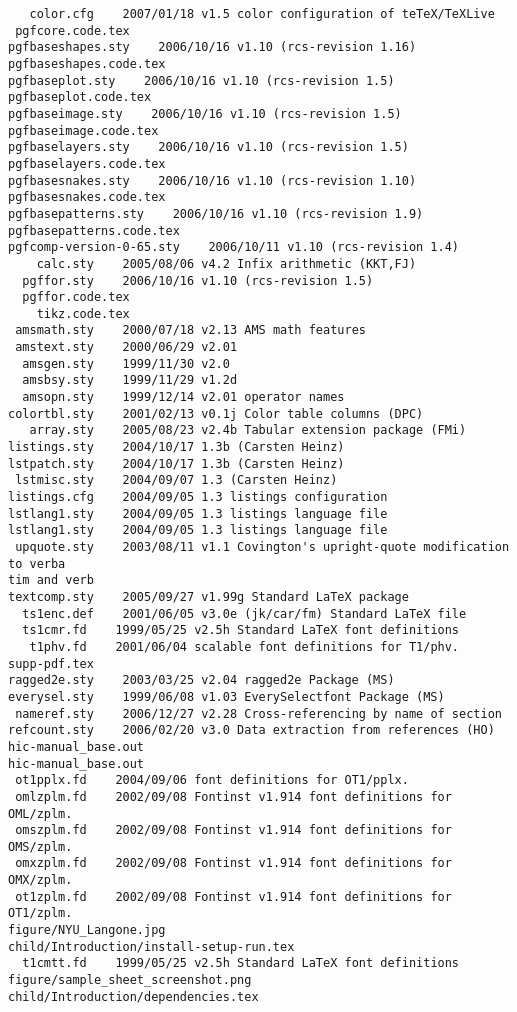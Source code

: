 \begin{lstlisting}
   color.cfg    2007/01/18 v1.5 color configuration of teTeX/TeXLive
 pgfcore.code.tex
pgfbaseshapes.sty    2006/10/16 v1.10 (rcs-revision 1.16)
pgfbaseshapes.code.tex
pgfbaseplot.sty    2006/10/16 v1.10 (rcs-revision 1.5)
pgfbaseplot.code.tex
pgfbaseimage.sty    2006/10/16 v1.10 (rcs-revision 1.5)
pgfbaseimage.code.tex
pgfbaselayers.sty    2006/10/16 v1.10 (rcs-revision 1.5)
pgfbaselayers.code.tex
pgfbasesnakes.sty    2006/10/16 v1.10 (rcs-revision 1.10)
pgfbasesnakes.code.tex
pgfbasepatterns.sty    2006/10/16 v1.10 (rcs-revision 1.9)
pgfbasepatterns.code.tex
pgfcomp-version-0-65.sty    2006/10/11 v1.10 (rcs-revision 1.4)
    calc.sty    2005/08/06 v4.2 Infix arithmetic (KKT,FJ)
  pgffor.sty    2006/10/16 v1.10 (rcs-revision 1.5)
  pgffor.code.tex
    tikz.code.tex
 amsmath.sty    2000/07/18 v2.13 AMS math features
 amstext.sty    2000/06/29 v2.01
  amsgen.sty    1999/11/30 v2.0
  amsbsy.sty    1999/11/29 v1.2d
  amsopn.sty    1999/12/14 v2.01 operator names
colortbl.sty    2001/02/13 v0.1j Color table columns (DPC)
   array.sty    2005/08/23 v2.4b Tabular extension package (FMi)
listings.sty    2004/10/17 1.3b (Carsten Heinz)
lstpatch.sty    2004/10/17 1.3b (Carsten Heinz)
 lstmisc.sty    2004/09/07 1.3 (Carsten Heinz)
listings.cfg    2004/09/05 1.3 listings configuration
lstlang1.sty    2004/09/05 1.3 listings language file
lstlang1.sty    2004/09/05 1.3 listings language file
 upquote.sty    2003/08/11 v1.1 Covington's upright-quote modification to verba
tim and verb
textcomp.sty    2005/09/27 v1.99g Standard LaTeX package
  ts1enc.def    2001/06/05 v3.0e (jk/car/fm) Standard LaTeX file
  ts1cmr.fd    1999/05/25 v2.5h Standard LaTeX font definitions
   t1phv.fd    2001/06/04 scalable font definitions for T1/phv.
supp-pdf.tex
ragged2e.sty    2003/03/25 v2.04 ragged2e Package (MS)
everysel.sty    1999/06/08 v1.03 EverySelectfont Package (MS)
 nameref.sty    2006/12/27 v2.28 Cross-referencing by name of section
refcount.sty    2006/02/20 v3.0 Data extraction from references (HO)
hic-manual_base.out
hic-manual_base.out
 ot1pplx.fd    2004/09/06 font definitions for OT1/pplx.
 omlzplm.fd    2002/09/08 Fontinst v1.914 font definitions for OML/zplm.
 omszplm.fd    2002/09/08 Fontinst v1.914 font definitions for OMS/zplm.
 omxzplm.fd    2002/09/08 Fontinst v1.914 font definitions for OMX/zplm.
 ot1zplm.fd    2002/09/08 Fontinst v1.914 font definitions for OT1/zplm.
figure/NYU_Langone.jpg
child/Introduction/install-setup-run.tex
  t1cmtt.fd    1999/05/25 v2.5h Standard LaTeX font definitions
figure/sample_sheet_screenshot.png
child/Introduction/dependencies.tex

\end{lstlisting}
